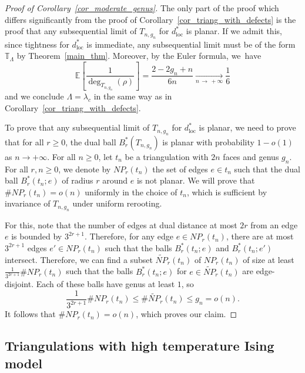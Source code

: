 \documentclass[10pt]{amsart}
\theoremstyle{definition}\newtheorem{defi}[theo]{Definition}\newtheorem{rema}[theo]{Remark}\newtheorem{exam}[theo]{Example}\newtheorem{exem}[theo]{Example}\newtheorem{nota}[theo]{Notation}
\newcommand{\loc}{\mathrm{loc}}
\newcommand{\TT}{\mathbb{T}}
\newcommand{\E}{\mathbb{E}}
\begin{document}
\begin{proof}[Proof of Corollary~\ref{cor_moderate_genus}]
The only part of the proof which differs significantly from the proof of Corollary~\ref{cor_triang_with_defects} is the proof that any subsequential limit of $T_{n,g_n}$ for $d_{\loc}^*$ is planar. If we admit this, since tightness for $d_{\loc}^*$ is immediate, any subsequential limit must be of the form $\TT_{\Lambda}$ by Theorem~\ref{main_thm}. Moreover, by the Euler formula, we~have
\[
\E\left[\frac{1}{\deg_{T_{n,g_n}}(\rho)} \right] = \frac{2-2g_n+n}{6n} \xrightarrow[n\,\to\,+\infty]{} \frac{1}{6}
\]
and we conclude $\Lambda=\lambda_c$ in the same way as in Corollary~\ref{cor_triang_with_defects}.

To prove that any subsequential limit of $T_{n,g_n}$ for $d^*_{\loc}$ is planar, we need to prove that for all $r \geq 0$, the dual ball $B_r^*(T_{n,g_n})$ is planar with probability $1-o(1)$ as $n \to +\infty$. For all $n \geq 0$, let $t_n$ be a triangulation with $2n$ faces and genus $g_n$. For all $r,n \geq 0$, we denote by $NP_r(t_n)$ the set of edges $e \in t_n$ such that the dual ball $B_r^*(t_n;e)$ of radius $r$ around $e$ is not planar. We will prove that $\# NP_r(t_n)=o(n)$ uniformly in the choice of $t_n$, which is sufficient by invariance of $T_{n,g_n}$ under uniform rerooting.

For this, note that the number of edges at dual distance at most $2r$ from an edge $e$ is bounded by $3^{2r+1}$. Therefore, for any edge $e \in NP_r(t_n)$, there are at most $3^{2r+1}$ edges $e' \in NP_r(t_n)$ such that the balls $B_r^*(t_n;e)$ and $B_r^*(t_n;e')$ intersect. Therefore, we can find a subset $\widetilde{NP}_r(t_n)$ of $NP_r(t_n)$ of size at least $\frac{1}{3^{2r+1}} \# NP_r(t_n)$ such that the balls $B_r^*(t_n ; e)$ for $e \in \widetilde{NP}_r(t_n)$ are edge-disjoint. Each of these balls have genus at least $1$, so
\[
\frac{1}{3^{2r+1}} \# NP_r(t_n) \leq \# \widetilde{NP}_r(t_n) \leq g_n=o(n).
\]
It follows that $\# NP_r(t_n)=o(n)$, which proves our claim.
\end{proof}

\subsection{Triangulations with high temperature Ising model}
\end{document}
